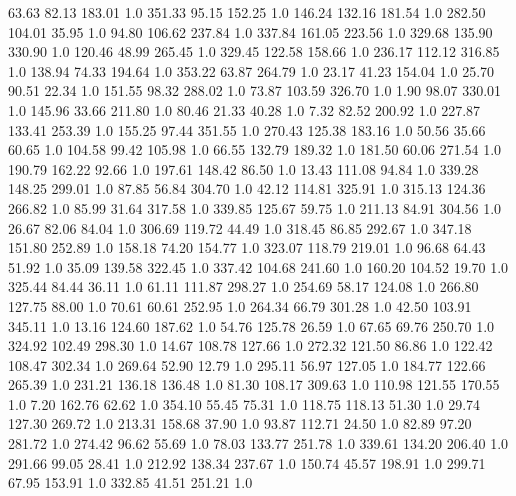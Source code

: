    63.63    82.13   183.01  1.0
  351.33    95.15   152.25  1.0
  146.24   132.16   181.54  1.0
  282.50   104.01    35.95  1.0
   94.80   106.62   237.84  1.0
  337.84   161.05   223.56  1.0
  329.68   135.90   330.90  1.0
  120.46    48.99   265.45  1.0
  329.45   122.58   158.66  1.0
  236.17   112.12   316.85  1.0
  138.94    74.33   194.64  1.0
  353.22    63.87   264.79  1.0
   23.17    41.23   154.04  1.0
   25.70    90.51    22.34  1.0
  151.55    98.32   288.02  1.0
   73.87   103.59   326.70  1.0
    1.90    98.07   330.01  1.0
  145.96    33.66   211.80  1.0
   80.46    21.33    40.28  1.0
    7.32    82.52   200.92  1.0
  227.87   133.41   253.39  1.0
  155.25    97.44   351.55  1.0
  270.43   125.38   183.16  1.0
   50.56    35.66    60.65  1.0
  104.58    99.42   105.98  1.0
   66.55   132.79   189.32  1.0
  181.50    60.06   271.54  1.0
  190.79   162.22    92.66  1.0
  197.61   148.42    86.50  1.0
   13.43   111.08    94.84  1.0
  339.28   148.25   299.01  1.0
   87.85    56.84   304.70  1.0
   42.12   114.81   325.91  1.0
  315.13   124.36   266.82  1.0
   85.99    31.64   317.58  1.0
  339.85   125.67    59.75  1.0
  211.13    84.91   304.56  1.0
   26.67    82.06    84.04  1.0
  306.69   119.72    44.49  1.0
  318.45    86.85   292.67  1.0
  347.18   151.80   252.89  1.0
  158.18    74.20   154.77  1.0
  323.07   118.79   219.01  1.0
   96.68    64.43    51.92  1.0
   35.09   139.58   322.45  1.0
  337.42   104.68   241.60  1.0
  160.20   104.52    19.70  1.0
  325.44    84.44    36.11  1.0
   61.11   111.87   298.27  1.0
  254.69    58.17   124.08  1.0
  266.80   127.75    88.00  1.0
   70.61    60.61   252.95  1.0
  264.34    66.79   301.28  1.0
   42.50   103.91   345.11  1.0
   13.16   124.60   187.62  1.0
   54.76   125.78    26.59  1.0
   67.65    69.76   250.70  1.0
  324.92   102.49   298.30  1.0
   14.67   108.78   127.66  1.0
  272.32   121.50    86.86  1.0
  122.42   108.47   302.34  1.0
  269.64    52.90    12.79  1.0
  295.11    56.97   127.05  1.0
  184.77   122.66   265.39  1.0
  231.21   136.18   136.48  1.0
   81.30   108.17   309.63  1.0
  110.98   121.55   170.55  1.0
    7.20   162.76    62.62  1.0
  354.10    55.45    75.31  1.0
  118.75   118.13    51.30  1.0
   29.74   127.30   269.72  1.0
  213.31   158.68    37.90  1.0
   93.87   112.71    24.50  1.0
   82.89    97.20   281.72  1.0
  274.42    96.62    55.69  1.0
   78.03   133.77   251.78  1.0
  339.61   134.20   206.40  1.0
  291.66    99.05    28.41  1.0
  212.92   138.34   237.67  1.0
  150.74    45.57   198.91  1.0
  299.71    67.95   153.91  1.0
  332.85    41.51   251.21  1.0
